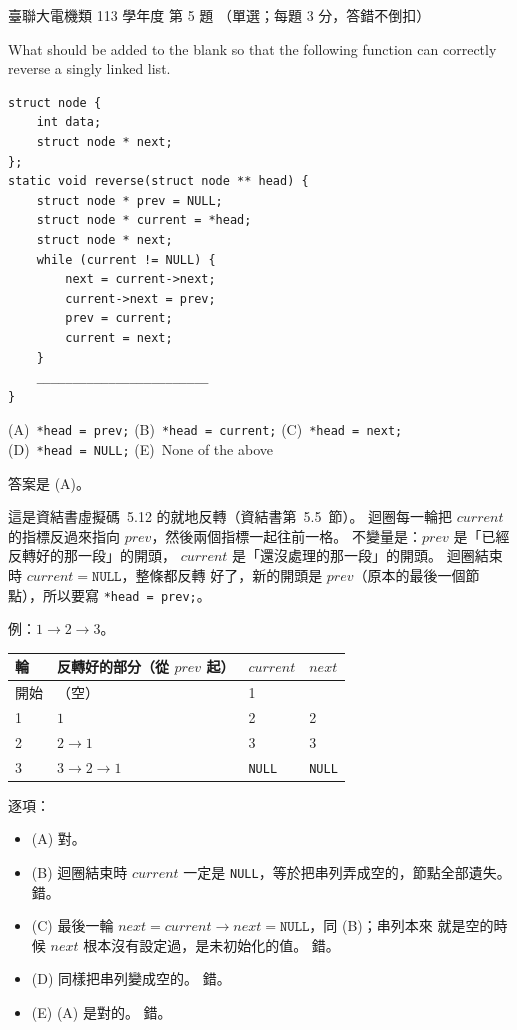 \begin{pastexam}[label={px:ust-113-ee-ds-05}]{臺聯大電機類 113 學年度 第 5 題}
（單選；每題 3 分，答錯不倒扣）

What should be added to the blank so that the following function can correctly reverse a singly
linked list.
\begin{verbatim}
struct node {
    int data;
    struct node * next;
};
static void reverse(struct node ** head) {
    struct node * prev = NULL;
    struct node * current = *head;
    struct node * next;
    while (current != NULL) {
        next = current->next;
        current->next = prev;
        prev = current;
        current = next;
    }
    ________________________
}
\end{verbatim}

(A)~\texttt{*head = prev;} \qquad (B)~\texttt{*head = current;} \qquad (C)~\texttt{*head = next;}\\
(D)~\texttt{*head = NULL;} \qquad (E)~None of the above
\end{pastexam}

\begin{pastsoln}
答案是 (A)。

這是資結書虛擬碼~5.12 的就地反轉（資結書第~5.5~節）。 迴圈每一輪把 $\mathit{current}$ 的指標反過來指向
$\mathit{prev}$，然後兩個指標一起往前一格。 不變量是：$\mathit{prev}$ 是「已經反轉好的那一段」的開頭，
$\mathit{current}$ 是「還沒處理的那一段」的開頭。 迴圈結束時 $\mathit{current} = \texttt{NULL}$，整條都反轉
好了，新的開頭是 $\mathit{prev}$（原本的最後一個節點），所以要寫 \texttt{*head = prev;}。

例：$1 \to 2 \to 3$。
\begin{center}
\begin{tabular}{llll}
\toprule
輪 & 反轉好的部分（從 $\mathit{prev}$ 起） & $\mathit{current}$ & $\mathit{next}$ \\
\midrule
開始 & （空） & 1 & \\
1 & $1$ & 2 & 2 \\
2 & $2 \to 1$ & 3 & 3 \\
3 & $3 \to 2 \to 1$ & \texttt{NULL} & \texttt{NULL} \\
\bottomrule
\end{tabular}
\end{center}

逐項：
\begin{itemize}
\item (A) 對。
\item (B) 迴圈結束時 $\mathit{current}$ 一定是 \texttt{NULL}，等於把串列弄成空的，節點全部遺失。 錯。
\item (C) 最後一輪 $\mathit{next} = \mathit{current}{\to}\mathit{next} = \texttt{NULL}$，同 (B)；串列本來
就是空的時候 $\mathit{next}$ 根本沒有設定過，是未初始化的值。 錯。
\item (D) 同樣把串列變成空的。 錯。
\item (E) (A) 是對的。 錯。
\end{itemize}
\end{pastsoln}
